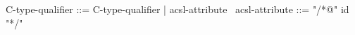 \begin{syntax}
C-type-qualifier ::= C-type-qualifier | acsl-attribute
\
acsl-attribute ::= "/*@" id "*/"
\end{syntax}
